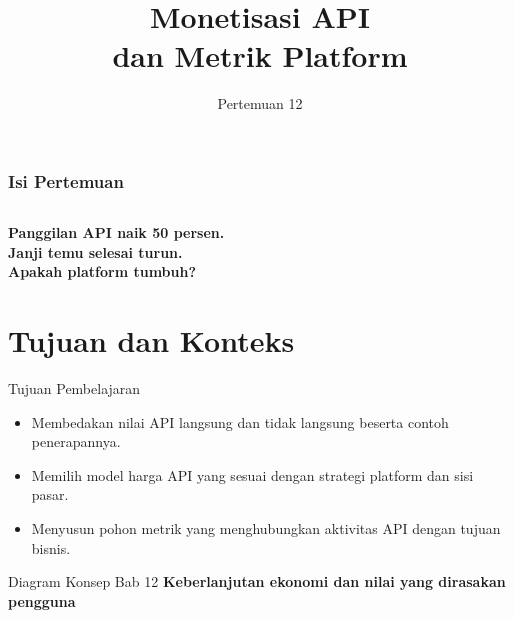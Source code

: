 \documentclass[aspectratio=169, table, 12pt]{beamer}
\title{\Huge Monetisasi API\\ \vspace{10pt} dan Metrik Platform}
\date{Pertemuan 12}
\begin{document}
\frame{\titlepage}

\begin{frame}
  \frametitle{Isi Pertemuan}
  \vspace{14pt}
  \begin{columns}[t]
    {\small\tableofcontents[sections={1-6}]}

    {\small\tableofcontents[sections={7-11}]}
  \end{columns}
\end{frame}

\begin{frame}{\hfill}
  \centering
  \Huge{\textbf{Panggilan API naik 50 persen.\\Janji temu selesai turun.\\Apakah platform tumbuh?}}
\end{frame}

\section{Tujuan dan Konteks}

\begin{frame}{{\Large Tujuan Pembelajaran}}
  \vspace{10pt}
  \begin{itemize}
    \item Membedakan nilai API langsung dan tidak langsung beserta contoh penerapannya.
    \item Memilih model harga API yang sesuai dengan strategi platform dan sisi pasar.
    \item Menyusun pohon metrik yang menghubungkan aktivitas API dengan tujuan bisnis.
  \end{itemize}
\end{frame}

\begin{frame}{{\Large Diagram Konsep Bab 12}}
  \centering
  {\small\bfseries Keberlanjutan ekonomi dan nilai yang dirasakan pengguna}\par\medskip
\end{frame}
\end{document}
